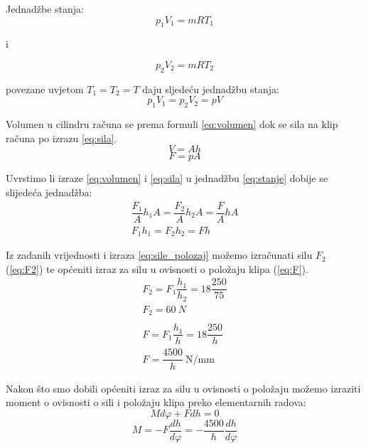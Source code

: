 Jednadžbe stanja:
\begin{equation}
\label{eq:stanje1}
p_1V_1=mRT_1
\end{equation}
\begin{center}
i
\end{center}
\begin{equation}
\label{eq:stanje2}
p_2V_2=mRT_2
\end{equation}

povezane uvjetom $T_1=T_2=T$ daju sljedeću jednadžbu stanja:
\begin{equation}
\label{eq:stanje}
p_1V_1=p_2V_2=pV
\end{equation}

Volumen u cilindru računa se prema formuli \ref{eq:volumen} dok se sila na klip računa po izrazu \ref{eq:sila}.
\begin{equation}
\label{eq:volumen}
V=Ah
\end{equation}
\begin{equation}
\label{eq:sila}
F=pA
\end{equation}

Uvrstimo li izraze \ref{eq:volumen} i \ref{eq:sila} u jednadžbu \ref{eq:stanje} dobije se slijedeća jednadžba:
\begin{gather}
\dfrac{F_1}{A}h_1A=\dfrac{F_2}{A}h_2A=\dfrac{F}{A}hA\\
\label{eq:sile_polozaj}
F_1h_1=F_2h_2=Fh
\end{gather}

Iz zadanih vrijednosti i izraza \ref{eq:sile_polozaj} možemo izračunati silu $F_2$ (\ref{eq:F2}) te općeniti izraz za silu u ovisnosti o položaju klipa (\ref{eq:F}).
\begin{gather}
F_2=F_1\dfrac{h_1}{h_2}=18\dfrac{250}{75}\\
\label{eq:F2}
F_2=60\ N\\
\nonumber \\
F=F_1\dfrac{h_1}{h}=18\dfrac{250}{h}\\
\label{eq:F}
F=\dfrac{4500}{h}\ \text{N/mm}
\end{gather}

Nakon što smo dobili općeniti izraz za silu u ovisnosti o položaju možemo izraziti moment o ovisnosti o sili i položaju klipa preko elementarnih radova:
\begin{equation}
Md\varphi + Fdh=0
\end{equation}
\begin{equation}
M=-F\dfrac{dh}{d\varphi }=-\dfrac{4500}{h}\dfrac{dh}{d\varphi}
\end{equation}


